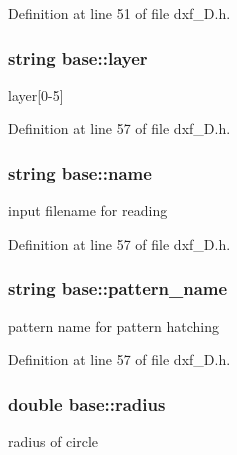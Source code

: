 Definition at line 51 of file dxf\-\_\-D.\-h.

\hypertarget{classbase_ace32e46b9aa7521f7523e57e148dd248}{
\subsubsection[{layer}]{\setlength{\rightskip}{0pt plus 5cm}string base\-::layer\hspace{0.3cm}{\ttfamily [protected]}}}\label{classbase_ace32e46b9aa7521f7523e57e148dd248}
layer\mbox{[}0-\/5\mbox{]} 

Definition at line 57 of file dxf\-\_\-D.\-h.

\hypertarget{classbase_adc118bdac066f100bb2ce0fa6d1cd657}{
\subsubsection[{name}]{\setlength{\rightskip}{0pt plus 5cm}string base\-::name\hspace{0.3cm}{\ttfamily [protected]}}}\label{classbase_adc118bdac066f100bb2ce0fa6d1cd657}
input filename for reading 

Definition at line 57 of file dxf\-\_\-D.\-h.

\hypertarget{classbase_a7ea31106027652ddba7c37809cade6ac}{
\subsubsection[{pattern\-\_\-name}]{\setlength{\rightskip}{0pt plus 5cm}string base\-::pattern\-\_\-name\hspace{0.3cm}{\ttfamily [protected]}}}\label{classbase_a7ea31106027652ddba7c37809cade6ac}
pattern name for pattern hatching 

Definition at line 57 of file dxf\-\_\-D.\-h.

\hypertarget{classbase_a36bed779447a9b6e7a902dc1d065ffb2}{
\subsubsection[{radius}]{\setlength{\rightskip}{0pt plus 5cm}double base\-::radius\hspace{0.3cm}{\ttfamily [protected]}}}\label{classbase_a36bed779447a9b6e7a902dc1d065ffb2}
radius of circle 

